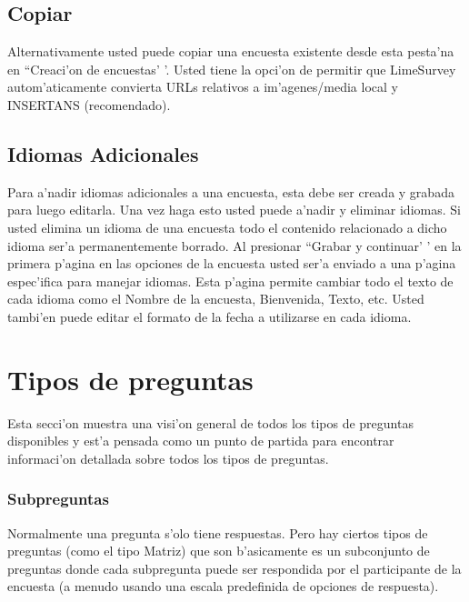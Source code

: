 \documentclass[12pt,spanish]{report}
\begin{document}
\subsection {Copiar}

Alternativamente usted puede copiar una encuesta existente desde esta pesta'na en ``Creaci'on de encuestas' '. Usted tiene la opci'on de permitir que LimeSurvey autom'aticamente convierta URLs relativos a im'agenes/media local y INSERTANS (recomendado).


\subsection{Idiomas Adicionales}

Para a'nadir idiomas adicionales a una encuesta, esta debe ser creada y grabada para luego editarla. Una vez haga esto usted puede a'nadir y eliminar idiomas. Si usted elimina un idioma de una encuesta todo el contenido relacionado a dicho idioma ser'a permanentemente borrado.
Al presionar ``Grabar y continuar' ' en la primera p'agina en las opciones de la encuesta usted ser'a enviado a una p'agina espec'ifica para manejar idiomas. Esta p'agina permite cambiar todo el texto de cada idioma como el Nombre de la encuesta, Bienvenida, Texto, etc. Usted tambi'en puede editar el formato de la fecha a utilizarse en cada idioma.


\section {Tipos de preguntas}

Esta secci'on muestra una visi'on general de todos los tipos de preguntas disponibles y est'a pensada como un punto de partida para encontrar informaci'on detallada sobre todos los tipos de preguntas.

\subsubsection{Subpreguntas}

Normalmente una pregunta s'olo tiene respuestas. Pero hay ciertos tipos de preguntas (como el tipo Matriz) que son b'asicamente es un subconjunto de preguntas donde cada subpregunta puede ser respondida por el participante de la encuesta (a menudo usando una escala predefinida de opciones de respuesta).
\end{document}
